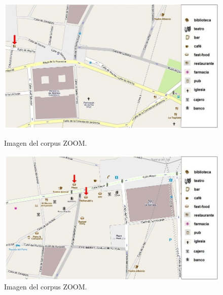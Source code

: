 \begin{figure}
\begin{minipage}[b]{0.5\linewidth}
\centering
\includegraphics[width=\textwidth]{images/corpus/mapa17.png}
\caption{Imagen del corpus ZOOM.}
\label{mapa17}
\end{minipage}
\hspace*{0cm}
\begin{minipage}[b]{0.5\linewidth}
\centering
\includegraphics[width=\textwidth]{images/corpus/mapa18.png}
\caption{Imagen del corpus ZOOM.}
\label{mapa18}
\end{minipage}
\end{figure}

